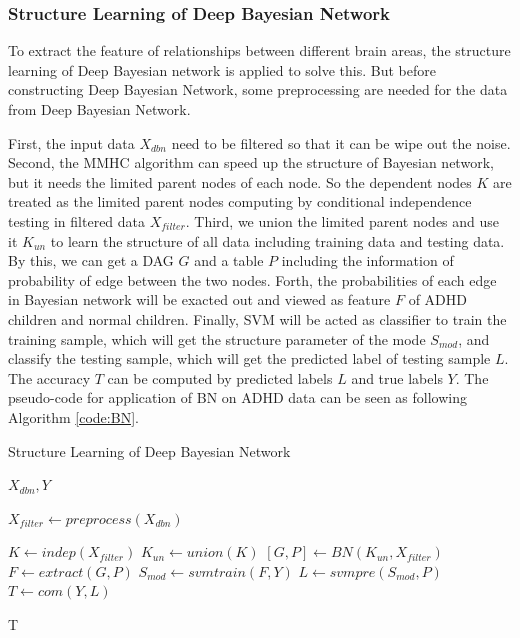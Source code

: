 \documentclass[10pt,twocolumn,letterpaper]{article}
\begin{document}
\subsubsection{Structure Learning of Deep Bayesian Network}
To extract the feature of relationships between different brain areas, the structure learning of Deep Bayesian network is applied to solve this. But before constructing Deep Bayesian Network, some preprocessing are needed for the data from Deep Bayesian Network.


First, the input data $X_{dbn}$ need to be filtered so that it can be wipe out the noise. Second, the MMHC algorithm can speed up the structure of Bayesian network, but it needs the limited parent nodes of each node. So the dependent nodes $K$ are treated as the limited parent nodes computing by conditional independence testing in filtered data $X_{filter}$. Third, we union the limited parent nodes and use it $K_{un}$ to learn the structure of all data including training data and testing data. By this, we can get a DAG $G$ and a table $P$ including the information of probability of edge between the two nodes. Forth, the probabilities of each edge in Bayesian network will be exacted out and viewed as feature $F$ of ADHD children and normal children. Finally, SVM will be acted as classifier to train the training sample, which will get the structure parameter of the mode $S_{mod}$, and classify the testing sample, which will get the predicted label of testing sample $L$. The accuracy $T$ can be computed by predicted labels $L$ and true labels $Y$. The pseudo-code for application of BN on ADHD data can be seen as following Algorithm \ref{code:BN}.  
\begin{algorithm}[h]
\caption{Structure Learning of Deep Bayesian Network}
\label{code:BN}
\begin{algorithmic}[1]
\Require
$X_{dbn},Y$

\State $X_{filter} \gets preprocess(X_{dbn})$ 

\State $K \gets indep(X_{filter})$ 
\State $K_{un} \gets union(K)$ 
\State $ [G,P] \gets BN(K_{un},X_{filter})$ 
\State $F \gets extract(G,P)$ 
\State $S_{mod} \gets svmtrain(F,Y)$ 
\State $L \gets svmpre(S_{mod},P)$ 
\State $T \gets com(Y,L)$ 

\Ensure
T
\end{algorithmic}
\end{algorithm}
\end{document}
